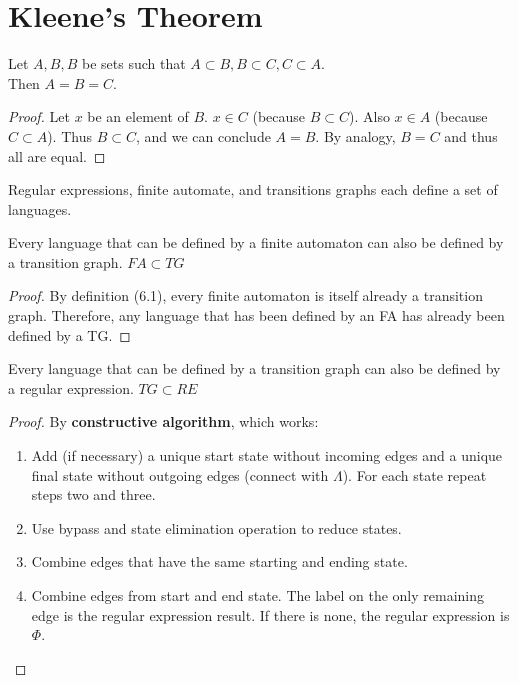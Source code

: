 \section{Kleene's Theorem}
\begin{theorem}
    Let \(A,B,B\) be sets such that \(A \subset B, B \subset C, C \subset A\).\\
    Then \(A=B=C\).
\end{theorem}
\begin{proof}
    Let \(x\) be an element of \(B\). \(x \in C\) (because \(B \subset C\)).
    Also \(x \in A\) (because \(C \subset A\)).
    Thus \(B \subset C\), and we can conclude \(A=B\).
    By analogy, \(B=C\) and thus all are equal.
\end{proof}
Regular expressions, finite automate, and transitions graphs each define a set of languages.
\begin{lemma}
    Every language that can be defined by a finite automaton can also be defined by a transition graph. \(FA \subset TG\)
\end{lemma}
\begin{proof}
    By definition (6.1), every finite automaton is itself already a transition graph.
    Therefore, any language that has been defined by an FA has already been defined by a TG.
\end{proof}
\begin{lemma}
    \label{lem:7.2}
    Every language that can be defined by a transition graph can also be defined by a regular expression. \(TG \subset RE\)
\end{lemma}
\begin{proof}
    By \textbf{constructive algorithm}, which works:
    \begin{enumerate}
            \item Add (if necessary) a unique start state without incoming edges and a unique final state without outgoing edges (connect with \(\Lambda\)).
            For each state repeat steps two and three.
            \item Use bypass and state elimination operation to reduce states.
            \item Combine edges that have the same starting and ending state.
            \item Combine edges from start and end state.
            The label on the only remaining edge is the regular expression result.
            If there is none, the regular expression is \(\Phi\).
        \end{enumerate}
\end{proof}
